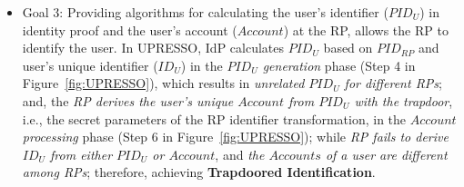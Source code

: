 \begin{itemize}
  \item Goal 3: Providing algorithms for calculating the user's identifier ($PID_U$) in identity proof and the user's account ($Account$) at the RP,
   allows the RP to identify the user.
  In UPRESSO, IdP calculates $PID_U$ based on $PID_{RP}$ and user's unique identifier ($ID_U$) in the \emph{$PID_U$ generation} phase (Step 4 in Figure~\ref{fig:UPRESSO}), which results in \emph{unrelated $PID_U$  for different RPs};
  and,  the \emph{RP derives the user's unique $Account$  from $PID_U$ with the  trapdoor}, i.e., the secret parameters of the RP identifier transformation,   in the \emph{$Account$ processing} phase (Step 6 in Figure~\ref{fig:UPRESSO}); while  \emph{RP fails to derive $ID_U$ from either $PID_U$ or $Account$}, and \emph{the $Accounts$ of a user are different among RPs};
   therefore, achieving \textbf{Trapdoored Identification}.




\end{itemize}


